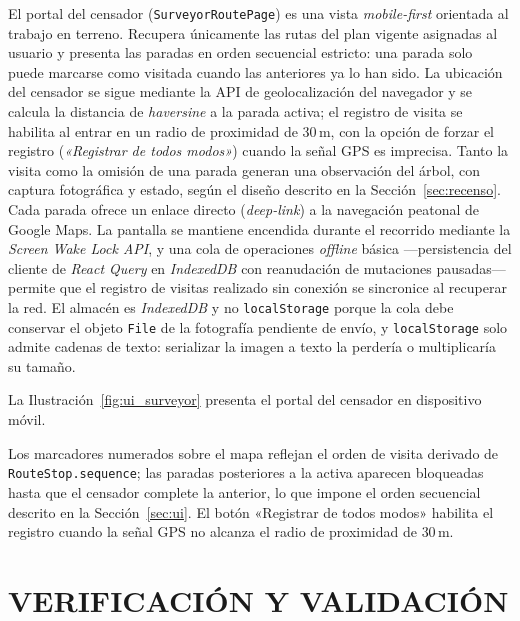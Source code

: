 El portal del censador (\texttt{SurveyorRoutePage}) es una vista \textit{mobile-first}
orientada al trabajo en terreno. Recupera únicamente las rutas del plan vigente
asignadas al usuario y presenta las paradas en orden secuencial estricto: una parada
solo puede marcarse como visitada cuando las anteriores ya lo han sido. La ubicación
del censador se sigue mediante la API de geolocalización del navegador y se calcula la
distancia de \textit{haversine} \citep{sinnott1984virtues} a la parada activa; el
registro de visita se habilita al
entrar en un radio de proximidad de 30\,m, con la opción de forzar el registro
(\textit{«Registrar de todos modos»}) cuando la señal GPS es imprecisa. Tanto la visita
como la omisión de una parada generan una observación del árbol, con captura
fotográfica y estado, según el diseño descrito en la
Sección~\ref{sec:recenso}. Cada parada ofrece
un enlace directo (\textit{deep-link}) a la navegación peatonal de Google Maps. La
pantalla se mantiene encendida durante el recorrido mediante la \textit{Screen Wake
Lock API}, y una cola de operaciones \textit{offline} básica ---persistencia del
cliente de \textit{React Query} en \textit{IndexedDB} con reanudación de mutaciones
pausadas--- permite que el registro de visitas realizado sin conexión se sincronice al
recuperar la red. El almacén es \textit{IndexedDB} y no \texttt{localStorage} porque
la cola debe conservar el objeto \texttt{File} de la fotografía pendiente de envío, y
\texttt{localStorage} solo admite cadenas de texto: serializar la imagen a texto la
perdería o multiplicaría su tamaño.

La Ilustración~\ref{fig:ui_surveyor} presenta el portal del censador en dispositivo móvil.


Los marcadores numerados sobre el mapa reflejan el orden de visita derivado de \texttt{RouteStop.sequence}; las paradas posteriores a la activa aparecen bloqueadas hasta que el censador complete la anterior, lo que impone el orden secuencial descrito en la Sección~\ref{sec:ui}. El botón «Registrar de todos modos» habilita el registro cuando la señal GPS no alcanza el radio de proximidad de $30$\,m.

\section{VERIFICACIÓN Y VALIDACIÓN}
\label{sec:verificacion}

